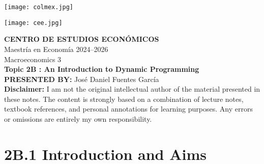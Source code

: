 \documentclass[12pt]{article}
\title{}
\author{}
\date{}
\begin{document}
\begin{titlepage}
    \vspace*{-1cm}
    \noindent
    \begin{minipage}[t]{0.49\textwidth}
        \texttt{[image: colmex.jpg]}
    \end{minipage}%
    \begin{minipage}[t]{0.49\textwidth}
        \raggedleft
        \texttt{[image: cee.jpg]}
    \end{minipage}

    \vspace*{2cm}

    \begin{center}
        \Huge \textbf{CENTRO DE ESTUDIOS ECONÓMICOS} \\[1.5em]
        \Large Maestría en Economía 2024--2026 \\[2em]
        \Large Macroeconomics 3 \\[3em]
        \LARGE \textbf{Topic 2B : An Introduction to Dynamic
Programming} \\[3em]
        \large \textbf{PRESENTED BY:} José Daniel Fuentes García \\[3em]
        \large \textbf{Disclaimer:} I am not the original intellectual author of the material presented in these notes. The content is strongly based on a combination of lecture notes, textbook references, and personal annotations for learning purposes. Any errors or omissions are entirely my own responsibility.\\[0.9em]
        
    \end{center}

    \vfill
\end{titlepage}

\newpage

\setcounter{secnumdepth}{2}
\setcounter{tocdepth}{3}
\tableofcontents

\newpage

\section*{\noindent\textbf{2B.1 Introduction and Aims}}
\end{document}
